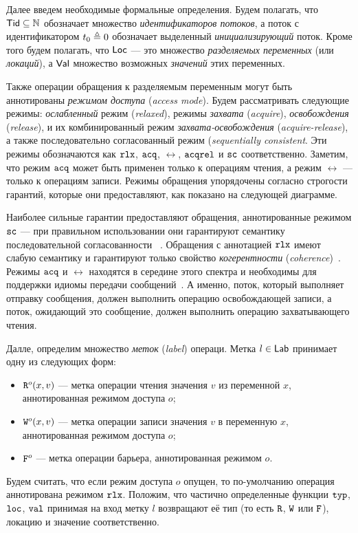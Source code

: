 

Далее введем необходимые формальные определения.
Будем полагать, что $\mathsf{Tid} \subseteq {\mathbb{N}}$ обозначает множество 
\emph{идентификаторов потоков}, а поток с идентификатором $t_0 \triangleq 0$
обозначает выделенный \emph{инициализирующий} поток.
Кроме того будем полагать, что $\mathsf{Loc}$ --- это множество 
\emph{разделяемых переменных} (или \emph{локаций}),
а $\mathsf{Val}$ множество возможных \emph{значений} этих переменных. 

Также операции обращения к разделяемым переменным 
могут быть аннотированы \emph{режимом доступа} (\emph{access mode}).
Будем рассматривать следующие режимы:
\emph{ослабленный} режим (\emph{relaxed}),
режимы \emph{захвата} (\emph{acquire}), \emph{освобождения} (\emph{release}),
и их комбинированный режим \emph{захвата-освобождения} (\emph{acquire-release}),
а также последовательно согласованный режим (\emph{sequentially consistent}.
Эти режимы обозначаются как $\mathtt{rlx}$, ${\mathtt{acq}}$, $\rel$, ${\mathtt{acqrel}}$ и ${\mathtt{sc}}$ соответственно.
Заметим, что режим ${\mathtt{acq}}$ может быть применен только к операциям чтения,
а режим $\rel$ --- только к операциям записи.
Режимы обращения упорядочены согласно строгости гарантий, 
которые они предоставляют, как показано на следующей диаграмме. 



Наиболее сильные гарантии предоставляют обращения, 
аннотированные режимом ${\mathtt{sc}}$ --- 
при правильном использовании они гарантируют семантику 
последовательной согласованности%
~\cite{Manson-al:POPL05,Lahav-al:PLDI17}.
Обращения с аннотацией $\mathtt{rlx}$ имеют слабую семантику 
и гарантируют только свойство 
\emph{когерентности} (\emph{coherence})~\cite{Alglave-al:TOPLAS14}.
Режимы ${\mathtt{acq}}$ и $\rel$ находятся в середине этого спектра
и необходимы для поддержки идиомы передачи сообщений~\cite{Lahav-al:POPL16}.
А именно, поток, который выполняет отправку сообщения, 
должен выполнить операцию освобождающей записи, 
а поток, ожидающий это сообщение, должен выполнить операцию захватывающего чтения. 

Далле, определим множество \emph{меток} (\emph{label}) операци. 
Метка $l \in \mathsf{Lab}$ принимает одну из следующих форм:
\begin{itemize}
  \item ${{\mathtt{R}}}^{o}({x},{v})$ --- метка операции чтения значения $v$ из переменной $x$, 
    аннотированная режимом доступа $o$;
  \item ${{\mathtt{W}}}^{o}({x},{v})$ --- метка операции записи значения $v$ в переменную $x$, 
    аннотированная режимом доступа $o$;
  \item ${\mathtt{F}}^o$ --- метка операции барьера, аннотированная режимом $o$.
\end{itemize}
Будем считать, что если режим доступа $o$ опущен, 
то по-умолчанию операция аннотирована режимом $\mathtt{rlx}$.
Положим, что частично определенные функции ${\mathtt{typ}}$, ${\mathtt{loc}}$, ${\mathtt{val}}$
принимая на вход метку $l$ возвращают её тип (то есть ${\mathtt{R}}$, ${\mathtt{W}}$ или ${\mathtt{F}}$),
локацию и значение соответственно.

